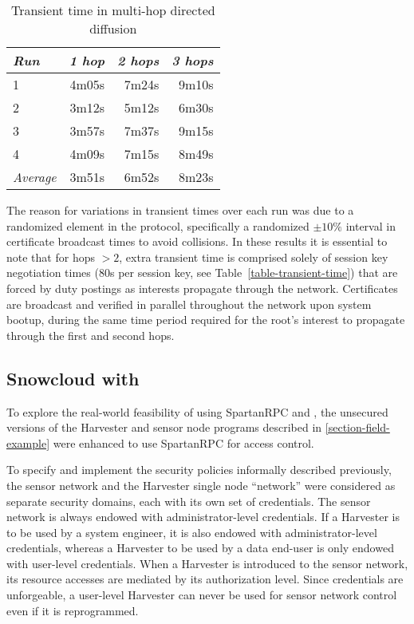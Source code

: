 \begin{table}[tbhp]
  \newcommand\T{\rule{0pt}{2.1ex}}
  \centering
  \caption{Transient time in multi-hop directed diffusion}
  {
  \begin{tabular}{|l|r|r|r|} \hline
    \textit{Run} \T & \textit{1 hop }
                    & \textit{2 hops}
                    & \textit{3 hops} \\ \hline \hline

                   1 \T &  4m05s & 7m24s & 9m10s \\ \hline
                   2 \T &  3m12s & 5m12s & 6m30s \\ \hline
                   3 \T &  3m57s & 7m37s & 9m15s \\ \hline
                   4 \T &  4m09s & 7m15s & 8m49s \\ \hline
    \textit{Average} \T &  3m51s & 6m52s & 8m23s \\ \hline
  \end{tabular}
  }
  \label{table-multi-hop-transient}
\end{table}

The reason for variations in transient times over each run was due to a randomized element in
the protocol, specifically a randomized $\pm 10\%$ interval in certificate broadcast times to
avoid collisions. In these results it is essential to note that for hops $> 2$, extra transient
time is comprised solely of session key negotiation times (80s per session key, see
Table~\ref{table-transient-time}) that are forced by duty postings as interests propagate
through the network. Certificates are broadcast and verified in parallel throughout the network
upon system bootup, during the same time period required for the root's interest to propagate
through the first and second hops.

\subsection{Snowcloud with \Sprocket}
\label{section-snowcloud-sprocket}

To explore the real-world feasibility of using SpartanRPC and \Sprocket, the unsecured versions
of the Harvester and sensor node programs described in \autoref{section-field-example} were
enhanced to use SpartanRPC for access control.

To specify and implement the security policies informally described previously, the sensor
network and the Harvester single node ``network'' were considered as separate security domains,
each with its own set of credentials. The sensor network is always endowed with
administrator-level credentials. If a Harvester is to be used by a system engineer, it is also
endowed with administrator-level credentials, whereas a Harvester to be used by a data end-user
is only endowed with user-level credentials. When a Harvester is introduced to the sensor
network, its resource accesses are mediated by its authorization level. Since credentials are
unforgeable, a user-level Harvester can never be used for sensor network control even if it is
reprogrammed.

